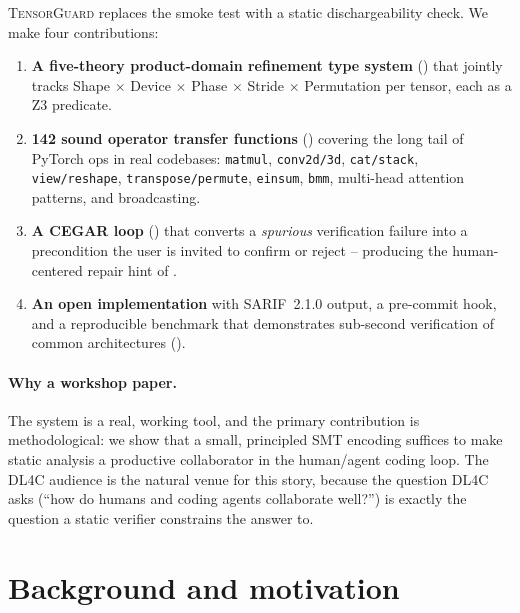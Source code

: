 \documentclass{article}
\theoremstyle{definition}
\newcommand{\TensorGuard}{\textsc{TensorGuard}}
\begin{document}
\TensorGuard{} replaces the smoke test with a static dischargeability
check.  We make four contributions:

\begin{enumerate}[nosep,leftmargin=*]
  \item \textbf{A five-theory product-domain refinement type system}
    () that jointly tracks Shape $\times$ Device
    $\times$ Phase $\times$ Stride $\times$ Permutation per tensor,
    each as a Z3 predicate.
  \item \textbf{142 sound operator transfer functions}
    () covering the long tail of PyTorch ops in
    real codebases: \texttt{matmul}, \texttt{conv2d/3d},
    \texttt{cat/stack}, \texttt{view/reshape},
    \texttt{transpose/permute}, \texttt{einsum}, \texttt{bmm},
    multi-head attention patterns, and broadcasting.
  \item \textbf{A CEGAR loop} () that converts a
    \emph{spurious} verification failure into a precondition the user
    is invited to confirm or reject -- producing the human-centered
    repair hint of .
  \item \textbf{An open implementation} with SARIF~2.1.0 output, a
    pre-commit hook, and a reproducible benchmark that demonstrates
    sub-second verification of common architectures
    ().
\end{enumerate}

\paragraph{Why a workshop paper.}
The system is a real, working tool, and the primary contribution is
methodological: we show that a small, principled SMT encoding suffices
to make static analysis a productive collaborator in the human/agent
coding loop.  The DL4C audience is the natural venue for this story,
because the question DL4C asks (``how do humans and coding agents
collaborate well?'') is exactly the question a static verifier
constrains the answer to.

\section{Background and motivation}\label{sec:background}
\end{document}
